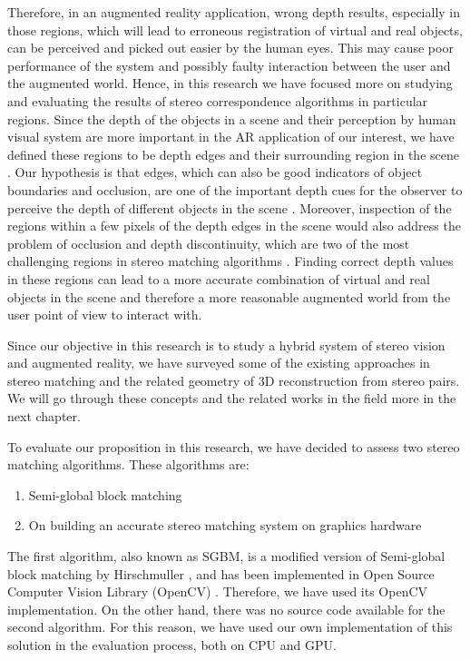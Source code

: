 Therefore, in an augmented reality application, wrong depth results, especially in those regions, which will lead to erroneous registration of virtual and real objects, 
can be perceived and picked out easier by the human eyes. This may cause poor performance of the system and possibly faulty interaction between 
the user and the augmented world. 
Hence, in this research we have focused more on studying and evaluating the results of stereo correspondence algorithms in particular regions. Since the depth of the objects 
in a scene and their perception by human visual system are more important in the AR application of our interest, we have 
defined these regions to be depth edges and their surrounding region in the scene \cite{liv05,kru10}.
Our hypothesis is that edges, which can also be good indicators of object boundaries and occlusion, are one of the important depth cues for the observer 
to perceive the depth of different objects in the scene \cite{sze11}. 
Moreover, inspection of the regions within a few pixels of the depth edges in the scene would also address the problem of occlusion and depth discontinuity, which are two of
the most challenging regions in stereo matching algorithms \cite{sch02}.
Finding correct depth values in these 
regions can lead to a more accurate combination of virtual and real objects in the scene and therefore a more reasonable augmented world from the user point of view to interact with. \newline
\newline

Since our objective in this research is to study a hybrid system of stereo vision and augmented reality, we have surveyed some of the existing approaches in stereo matching and the
related geometry of 3D reconstruction from stereo pairs. We will go through these concepts and the related works in the field more in the next chapter. 

To evaluate our proposition in this research, we have decided to assess two stereo matching algorithms. These algorithms are:
\begin{enumerate}
\item Semi-global block matching
\item On building an accurate stereo matching system on graphics hardware \cite{mei11}
\end{enumerate}

The first algorithm, also known as SGBM, is a modified version of Semi-global block matching by Hirschmuller \cite{hir08}, 
and has been implemented in Open Source Computer Vision Library (OpenCV) \cite{sgbm}. Therefore, we have used its OpenCV implementation. 
On the other hand, there was no source code available for the second algorithm. For this reason, we have used our own implementation of this solution in the evaluation process, both on CPU and GPU.

